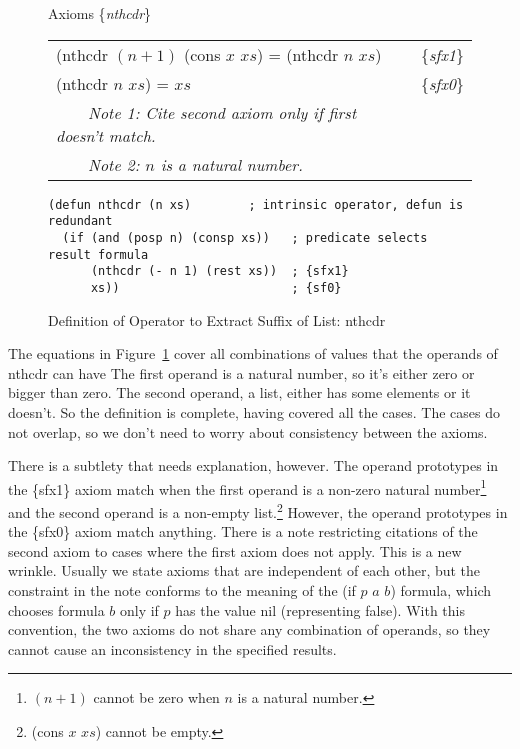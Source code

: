\begin{figure}
\begin{center}
Axioms \{\emph{nthcdr}\} \\
\begin{tabular}{ll}
(nthcdr $(n+1)$ (cons $x$ $xs$) = (nthcdr $n$ $xs$) & \{\emph{sfx1}\}   \\
(nthcdr $n$ $xs$) = $xs$                            & \{\emph{sfx0}\}   \\
~~~~\emph{Note 1: Cite second axiom only if first doesn't match.}&\\
~~~~\emph{Note 2: $n$ is a natural number.}
\end{tabular}
\begin{Verbatim}
(defun nthcdr (n xs)        ; intrinsic operator, defun is redundant
  (if (and (posp n) (consp xs))   ; predicate selects result formula
      (nthcdr (- n 1) (rest xs))  ; {sfx1}
      xs))                        ; {sf0}
\end{Verbatim}
\end{center}
\caption{Definition of Operator to Extract Suffix of List: nthcdr}
\label{fig:nthcdr-defun}
\end{figure}


The equations in Figure~\ref{fig:nthcdr-defun} cover all combinations
of values that the operands of nthcdr can have
The first operand is a natural number,
so it's either zero or bigger than zero.
The second operand, a list, either has some elements or it doesn't.
So the definition is complete, having covered all the cases.
The cases do not overlap, so we don't need to worry about
consistency between the axioms.

There is a subtlety that needs explanation, however.
The operand prototypes in the
\{sfx1\} axiom match when the first operand is a non-zero natural number\footnote{$(n+1)$
cannot be zero when $n$ is a natural number.}
and the second operand is a non-empty list.\footnote{(cons $x$ $xs$) cannot be empty.}
However, the operand prototypes in the \{sfx0\} axiom match anything.
There is a note restricting
citations of the second axiom to cases
where the first axiom does not apply.
This is a new wrinkle.
Usually we state axioms that are independent of each other,
but the constraint in the note conforms to the meaning
of the (if $p$ $a$ $b$) formula, which chooses formula $b$
only if $p$ has the value nil (representing false).
With this convention, the two axioms
do not share any combination of operands, so they cannot
cause an inconsistency in the specified results.

